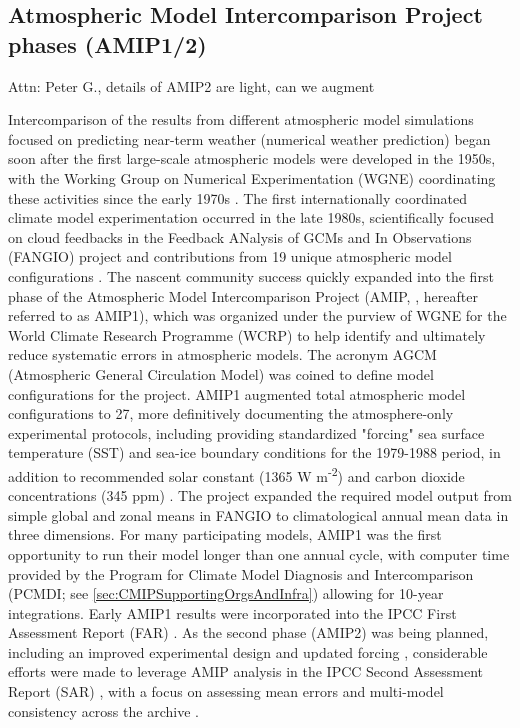 \documentclass[gmd, preprint]{copernicus}
\def\cred#1{{\color{red}#1}}
\begin{document}
\subsection{Atmospheric Model Intercomparison Project phases (AMIP1/2)}
\label{sec:amip1And2}
\cred{Attn: Peter G., details of AMIP2 are light, can we augment}

Intercomparison of the results from different atmospheric model simulations focused on predicting near-term weather (numerical weather prediction) began soon after the first large-scale atmospheric models were developed in the 1950s, with the Working Group on Numerical Experimentation (WGNE) coordinating these activities since the early 1970s \citep{gates_ams_1992}. The first internationally coordinated climate model experimentation occurred in the late 1980s, scientifically focused on cloud feedbacks in the Feedback ANalysis of GCMs and In Observations (FANGIO) project and contributions from 19 unique atmospheric model configurations \citep{cess_methodology_1988, cess_interpretation_1989, cess_intercomparison_1990, cess_first_1991}. The nascent community success quickly expanded into the first phase of the Atmospheric Model Intercomparison Project (AMIP, \citet{gates_amip_1992}, hereafter referred to as AMIP1), which was organized under the purview of WGNE for the World Climate Research Programme (WCRP) to help identify and ultimately reduce systematic errors in atmospheric models. The acronym AGCM (Atmospheric General Circulation Model) was coined to define model configurations for the project. AMIP1 augmented total atmospheric model configurations to 27, more definitively documenting the atmosphere-only experimental protocols, including providing standardized "forcing" sea surface temperature (SST) and sea-ice boundary conditions for the 1979-1988 period, in addition to recommended solar constant (1365 W m\textsuperscript{-2}) and carbon dioxide concentrations (345 ppm) \citep{gates_amip_1991}. The project expanded the required model output from simple global and zonal means in FANGIO to climatological annual mean data in three dimensions. For many participating models, AMIP1 was the first opportunity to run their model longer than one annual cycle, with computer time provided by the Program for Climate Model Diagnosis and Intercomparison (PCMDI; see \autoref{sec:CMIPSupportingOrgsAndInfra}) allowing for 10-year integrations. Early AMIP1 results were incorporated into the IPCC First Assessment Report (FAR) \citep{gates_validation_1990}. As the second phase (AMIP2) was being planned, including an improved experimental design and updated forcing \citep{liang_pcmdi_1997, taylor_pcmdi_2000}, considerable efforts were made to leverage AMIP analysis in the IPCC Second Assessment Report (SAR) \citep{gates_climate_1996}, with a focus on assessing mean errors and multi-model consistency across the archive \citep{gates_amip_1995}.
\end{document}
